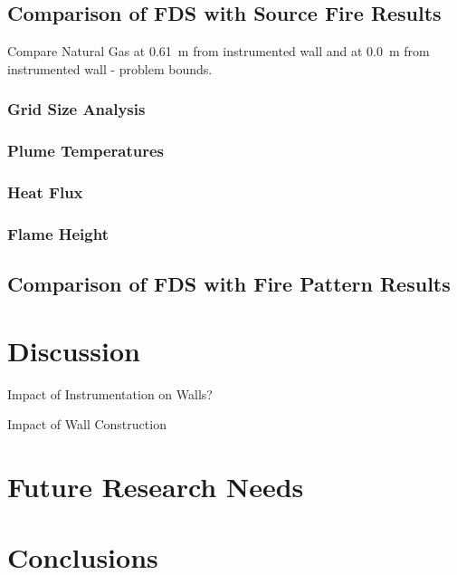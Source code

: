 \documentclass[twoside]{uocthesis}
\begin{document}
\section{Comparison of FDS with Source Fire Results}

Compare Natural Gas at 0.61~m from instrumented wall and at 0.0~m from instrumented wall - problem bounds.




\subsection{Grid Size Analysis}





\subsection{Plume Temperatures}

\subsection{Heat Flux}

\subsection{Flame Height}

\section{Comparison of FDS with Fire Pattern Results}

\chapter{Discussion}


Impact of Instrumentation on Walls?

Impact of Wall Construction


\chapter{Future Research Needs}



\chapter{Conclusions}






\end{document}

